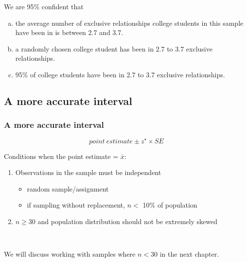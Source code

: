 
\begin{frame}
\frametitle{}


We are 95\% confident that
\begin{enumerate}[(a)]
\item the average number of exclusive relationships college students in this sample have been in is between 2.7 and 3.7.
\item a randomly chosen college student has been in 2.7 to 3.7 exclusive relationships.
\item 95\% of college students have been in 2.7 to 3.7 exclusive relationships.
\end{enumerate}

\end{frame}


\subsection{A more accurate interval}


\begin{frame}
\frametitle{A more accurate interval}

{\[ point~estimate\pm z^\star \times SE \] }

\pause

Conditions when the point estimate = $\bar{x}$:
\begin{enumerate}

\item {} Observations in the sample must be independent
\begin{itemize}
\item random sample/assignment
\item if sampling without replacement, $n <$ 10\% of population
\end{itemize}

\item {} $n \ge 30$ and population distribution should not be extremely skewed

\end{enumerate}

$\:$ \\
\pause

 We will discuss working with samples where $n < 30$ in the next chapter.

\end{frame}

